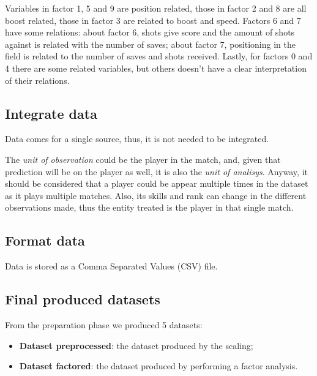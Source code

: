 Variables in factor 1, 5 and 9 are position related, those in factor 2 and 8 are all boost related, those in factor 3 are related to boost and speed. Factors 6 and 7 have some relations: about factor 6, shots give score and the amount of shots against is related with the number of saves; about factor 7, positioning in the field is related to the number of saves and shots received. Lastly, for factors 0 and 4 there are some related variables, but others doesn't have a clear interpretation of their relations.

\subsection{Integrate data}

Data comes for a single source, thus, it is not needed to be integrated. 

The \textit{unit of observation} could be the player in the match, and, given that prediction will be on the player as well, it is also the \textit{unit of analisys}. Anyway, it should be considered that a player could be appear multiple times in the dataset as it plays multiple matches. Also, its skills and rank can change in the different observations made, thus the entity treated is the player in that single match.

\subsection{Format data}

Data is stored as a Comma Separated Values (CSV) file.

\subsection{Final produced datasets}

From the preparation phase we produced 5 datasets:

\begin{itemize}
    \item \textbf{Dataset preprocessed}: the dataset produced by the scaling;
    \item \textbf{Dataset factored}: the dataset produced by performing a factor analysis.
\end{itemize}